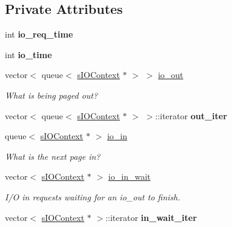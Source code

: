 \subsection*{\-Private \-Attributes}
\begin{DoxyCompactItemize}
\item 
\hypertarget{classcIOControl_a4b9aa88be2dc67cf9ed33051dba6eebb}{int {\bfseries io\-\_\-req\-\_\-time}}\label{da/d8f/classcIOControl_a4b9aa88be2dc67cf9ed33051dba6eebb}

\item 
\hypertarget{classcIOControl_aacf61a8d660e60a7e444e32474b7875a}{int {\bfseries io\-\_\-time}}\label{da/d8f/classcIOControl_aacf61a8d660e60a7e444e32474b7875a}

\item 
vector$<$ queue$<$ \hyperlink{structsIOContext}{s\-I\-O\-Context} $\ast$ $>$ $>$ \hyperlink{classcIOControl_a51a2c3ce8bf36b9302d835afb204c821}{io\-\_\-out}
\begin{DoxyCompactList}\small\item\em \-What is being paged out? \end{DoxyCompactList}\item 
\hypertarget{classcIOControl_abb546a7c4d622af5e4a95a5742c33b10}{vector$<$ queue$<$ \hyperlink{structsIOContext}{s\-I\-O\-Context} $\ast$ $>$\*
 $>$\-::iterator {\bfseries out\-\_\-iter}}\label{da/d8f/classcIOControl_abb546a7c4d622af5e4a95a5742c33b10}

\item 
queue$<$ \hyperlink{structsIOContext}{s\-I\-O\-Context} $\ast$ $>$ \hyperlink{classcIOControl_a6918230a2e9f6e1e5fdade78da2d835b}{io\-\_\-in}
\begin{DoxyCompactList}\small\item\em \-What is the next page in? \end{DoxyCompactList}\item 
\hypertarget{classcIOControl_a8e33089e107631ba9cc042d72939d913}{vector$<$ \hyperlink{structsIOContext}{s\-I\-O\-Context} $\ast$ $>$ \hyperlink{classcIOControl_a8e33089e107631ba9cc042d72939d913}{io\-\_\-in\-\_\-wait}}\label{da/d8f/classcIOControl_a8e33089e107631ba9cc042d72939d913}

\begin{DoxyCompactList}\small\item\em \-I/\-O in requests waiting for an io\-\_\-out to finish. \end{DoxyCompactList}\item 
\hypertarget{classcIOControl_a3bfc00997effdb1cd33c02bba4a12337}{vector$<$ \hyperlink{structsIOContext}{s\-I\-O\-Context} $\ast$ $>$\-::iterator {\bfseries in\-\_\-wait\-\_\-iter}}\label{da/d8f/classcIOControl_a3bfc00997effdb1cd33c02bba4a12337}


\end{DoxyCompactItemize}
